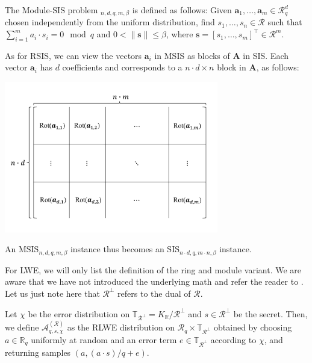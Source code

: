 \begin{definition}
    The Module-SIS problem $_{n, d, q, m, \beta}$ is defined as follows: Given  $\mathbf{a}_1, \ldots, \mathbf{a}_m \in \mathcal{R}_q^d$ chosen independently from the uniform distribution, find $s_1, \ldots, s_n \in \mathcal{R}$ such that $\sum_{i=1}^m a_i \cdot s_i = 0\mod q$ and $0 < \| \mathbf{s}\| \leq \beta$, where $\mathbf{s} = \left[s_1, \ldots, s_m\right]^\intercal \in \mathcal{R}^m$.
\end{definition} %
As for RSIS, we can view the vectors $\mathbf{a}_i$ in MSIS as blocks of $\mathbf{A}$ in SIS. Each vector $\mathbf{a}_i$ has $d$ coefficients and corresponds to a $n\cdot d \times n$ block in $\mathbf{A}$, as follows:
\begin{center}
    \includegraphics[width=0.7\textwidth]{graphics/MSIS_matrix.pdf}
\end{center}
An MSIS$_{n, d, q, m, \beta}$ instance thus becomes an SIS$_{n\cdot d, q, m \cdot n, \beta}$ instance.


For LWE, we will only list the definition of the ring and module variant. We are aware that we have not introduced the underlying math and refer the reader to \cite{LS15}. Let us just note here that $\mathcal{R}^\perp$ refers to the dual of $\mathcal{R}$.
\begin{definition}
    Let $\chi$ be the error distribution on $\mathbb{T}_{\mathcal{R}^\perp} = K_\mathbb{R} / \mathcal{R}^\perp$ and $s \in \mathcal{R}^\perp$ be the secret. Then, we define $\mathcal{A}_{q, s, \chi}^{(\mathcal{R})}$ as the RLWE distribution on $\mathcal{R}_q \times \mathbb{T}_{\mathcal{R}^\perp}$ obtained by choosing $a \in \mathbb{R}_q$ uniformly at random and an error term $e \in \mathbb{T}_{\mathcal{R}^\perp}$ according to $\chi$, and returning samples $(a, (a \cdot s)/q + e)$.
\end{definition}

